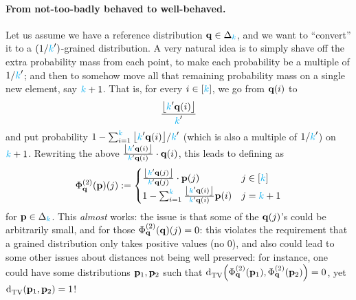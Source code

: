 \paragraph{From not-too-badly behaved to well-behaved.} Let us assume we have a reference distribution $\mathbf{q}\in\Delta_{{\textcolor{cyan}{k}}}$, and we want to ``convert'' it to a $(1/{\textcolor{cyan}{k}}')$-grained distribution. A very natural idea is to simply shave off the extra probability mass from each point, to make each probability be a multiple of $1/{\textcolor{cyan}{k}}'$; and then to somehow move all that remaining probability mass on a single new element, say ${\textcolor{cyan}{k}}+1$. That is, for every $i\in[{\textcolor{cyan}{k}}]$, we go from $\mathbf{q}(i)$ to
\[
	\frac{\flr{\ab'\q(i)}}{\ab'}
\]
and put probability $1-\sum_{i=1}^\ab {\flr{\ab'\q(i)}}/{\ab'}$ (which is also a multiple of $1/{\textcolor{cyan}{k}}'$)  on ${\textcolor{cyan}{k}}+1$. Rewriting the above $\frac{\flr{\ab'\q(i)}}{\ab'\q(i)}\cdot \q(i)$, this leads to defining  as
\begin{equation}
	\label{def:phi:mapping:l1:making:grained}
	\Phi^{(2)}_\q(\p)(j) \eqdef 
	\begin{cases}
		\frac{\flr{\ab'\q(j)}}{\ab'\q(j)}\cdot \p(j) & j\in[\ab]\\
		1-\sum_{i=1}^\ab \frac{\flr{\ab'\q(i)}}{\ab'\q(i)}\p(i) & j=\ab+1
	\end{cases}
\end{equation}
for $\mathbf{p}\in\Delta_{{\textcolor{cyan}{k}}}$. This \emph{almost} works: the issue is that some of the $\mathbf{q}(j)$'s could be arbitrarily small, and for those $\Phi^{(2)}_{\mathbf{q}}(\mathbf{q})(j) = 0$: this violates the requirement that a grained distribution only takes positive values (no $0$), and also could lead to some other issues about distances not being well preserved: for instance, one could have some distributions $\mathbf{p}_1,\mathbf{p}_2$ such that $\totalvardist{\Phi^{(2)}_\q(\p_1)}{\Phi^{(2)}_\q(\p_2)}=0$, yet $\totalvardist{\p_1}{\p_2}=1$!

